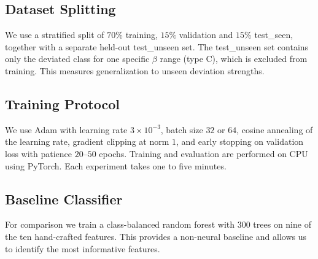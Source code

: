 \subsection{Dataset Splitting}

We use a stratified split of $70\%$ training, $15\%$ validation and
$15\%$ test\_seen, together with a separate held-out test\_unseen set.
The test\_unseen set contains only the deviated class for one specific
$\beta$ range (type C), which is excluded from training. This measures
generalization to unseen deviation strengths.

\subsection{Training Protocol}

We use Adam with learning rate $3 \times 10^{-3}$, batch size $32$ or
$64$, cosine annealing of the learning rate, gradient clipping at
norm $1$, and early stopping on validation loss with patience
$20$--$50$ epochs. Training and evaluation are performed on CPU using
PyTorch. Each experiment takes one to five minutes.

\subsection{Baseline Classifier}

For comparison we train a class-balanced random forest with $300$ trees
on nine of the ten hand-crafted features. This provides a non-neural
baseline and allows us to identify the most informative features.
